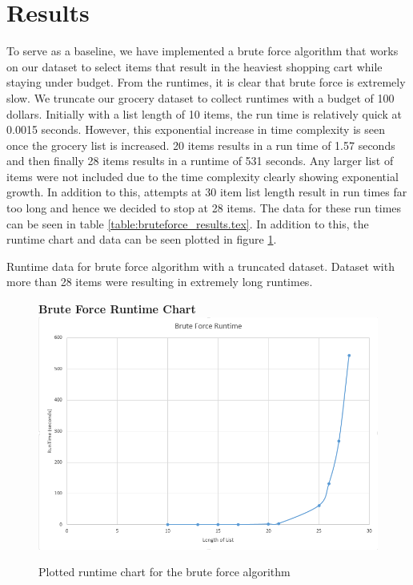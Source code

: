 \documentclass[10pt,journal,compsoc]{IEEEtran}
\begin{document}
\section{Results}
To serve as a baseline, we have implemented a brute force algorithm that works
on our dataset to select items that result in the heaviest shopping cart while
staying under budget. From the runtimes, it is clear that brute force is
extremely slow. We truncate our grocery dataset to collect runtimes with a
budget of 100 dollars. Initially with a list length of 10 items, the run time is
relatively quick at 0.0015 seconds. However, this exponential increase in time
complexity is seen once the grocery list is increased. 20 items results in a run
time of 1.57 seconds and then finally 28 items results in a runtime of 531
seconds. Any larger list of items were not included due to the time complexity
clearly showing exponential growth. In addition to this, attempts at 30 item
list length result in run times far too long and hence we decided to stop at 28
items. The data for these run times can be seen in table
\ref{table:bruteforce_results.tex}. In addition to this, the runtime chart and
data can be seen plotted in figure \ref{fig:bruteforce_timecomplexity.png}.

\begin{table}[h]
    \setlength\tabcolsep{2pt}
    \centering
    
    \caption{Runtime data for brute force algorithm with a truncated dataset. Dataset with more than 28 items were resulting in extremely long runtimes.}
    \label{table:bruteforce_results.tex}
\end{table}

\begin{figure}[h]
    \centering
    \textbf{Brute Force Runtime Chart}
    \includegraphics[width=\columnwidth]{assets/bruteforce_runtime.png}
    \caption{Plotted runtime chart for the brute force algorithm}
    \label{fig:bruteforce_timecomplexity.png}
\end{figure}
\end{document}
